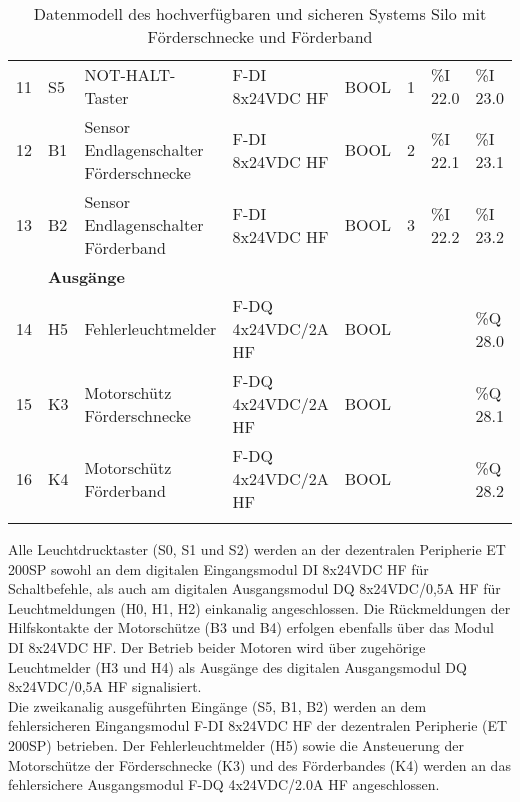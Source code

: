 \begin{table}[H]
\begin{longtable}{|llllllll|}
        \multicolumn{1}{|l|}{11} & \multicolumn{1}{l|}{S5} & \multicolumn{1}{l|}{NOT-HALT-Taster} & \multicolumn{1}{l|}{F-DI 8x24VDC HF} & \multicolumn{1}{l|}{BOOL} & \multicolumn{1}{l|}{1}     & \multicolumn{1}{l|}{\%I 22.0} & \%I 23.0 \\
        \multicolumn{1}{|l|}{12} & \multicolumn{1}{l|}{B1} & \multicolumn{1}{l|}{Sensor Endlagenschalter Förderschnecke} & \multicolumn{1}{l|}{F-DI 8x24VDC HF} & \multicolumn{1}{l|}{BOOL} & \multicolumn{1}{l|}{2} & \multicolumn{1}{l|}{\%I 22.1} & \%I 23.1 \\
        \multicolumn{1}{|l|}{13} & \multicolumn{1}{l|}{B2} & \multicolumn{1}{l|}{Sensor Endlagenschalter Förderband} & \multicolumn{1}{l|}{F-DI 8x24VDC HF} & \multicolumn{1}{l|}{BOOL} & \multicolumn{1}{l|}{3} & \multicolumn{1}{l|}{\%I 22.2} & \%I 23.2 \\ \hline
        \rowcolor{lightGrey}
        & \multicolumn{7}{l|}{\textbf{Ausgänge}} \\ \hline
        \multicolumn{1}{|l|}{14} & \multicolumn{1}{l|}{H5} & \multicolumn{1}{l|}{Fehlerleuchtmelder} & \multicolumn{1}{l|}{F-DQ 4x24VDC/2A HF} & \multicolumn{1}{l|}{BOOL} & \multicolumn{1}{l|}{}      & \multicolumn{1}{l|}{} & \%Q 28.0 \\
        \multicolumn{1}{|l|}{15} & \multicolumn{1}{l|}{K3} & \multicolumn{1}{l|}{Motorschütz Förderschnecke} & \multicolumn{1}{l|}{F-DQ 4x24VDC/2A HF} & \multicolumn{1}{l|}{BOOL} & \multicolumn{1}{l|}{} & \multicolumn{1}{l|}{} & \%Q 28.1 \\
        \multicolumn{1}{|l|}{16} & \multicolumn{1}{l|}{K4} & \multicolumn{1}{l|}{Motorschütz Förderband} & \multicolumn{1}{l|}{F-DQ 4x24VDC/2A HF} & \multicolumn{1}{l|}{BOOL} & \multicolumn{1}{l|}{}      & \multicolumn{1}{l|}{} & \%Q 28.2 \\ \hline
        \caption[Datenmodell des Systems]{Datenmodell des hochverfügbaren und sicheren Systems Silo mit Förderschnecke und Förderband}
        \label{tab:my-table1}\\
    \end{longtable}
\end{table}

Alle Leuchtdrucktaster (S0, S1 und S2) werden an der dezentralen Peripherie ET 200SP sowohl an dem digitalen Eingangsmodul \glqq DI 8x24VDC HF\grqq{} für Schaltbefehle, als auch am digitalen Ausgangsmodul \glqq DQ 8x24VDC/0,5A HF\grqq{} für Leuchtmeldungen (H0, H1, H2) einkanalig angeschlossen. Die Rückmeldungen der Hilfskontakte der Motorschütze (B3 und B4) erfolgen ebenfalls über das Modul \glqq DI 8x24VDC HF\grqq{}. Der Betrieb beider Motoren wird über zugehörige Leuchtmelder (H3 und H4) als Ausgänge des digitalen Ausgangsmodul \glqq DQ 8x24VDC/0,5A HF\grqq{} signalisiert. \\
Die zweikanalig ausgeführten Eingänge (S5, B1, B2) werden an dem fehlersicheren Eingangsmodul \glqq F-DI 8x24VDC HF\grqq{} der dezentralen Peripherie (ET 200SP) betrieben. Der Fehlerleuchtmelder (H5) sowie die Ansteuerung der Motorschütze der Förderschnecke (K3) und des Förderbandes (K4) werden an das fehlersichere Ausgangsmodul \glqq F-DQ 4x24VDC/2.0A HF\grqq{} angeschlossen.